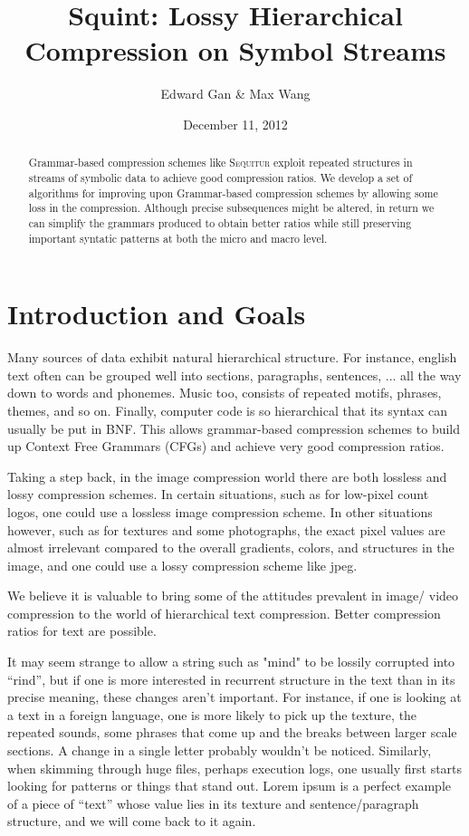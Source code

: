 \documentclass[11pt]{article}
\newcommand{\Sequitur}{\textsc{Sequitur}\xspace}
\begin{document}


\title{Squint: Lossy Hierarchical Compression on Symbol Streams}
\author{Edward Gan \& Max Wang}
\date{December 11, 2012}
\maketitle

\begin{abstract}
Grammar-based compression schemes like \Sequitur exploit repeated structures
in streams of symbolic data to achieve good compression ratios.
We develop a set of algorithms for improving upon Grammar-based compression 
schemes by allowing some loss in the compression. Although precise 
subsequences might be altered, in return we can simplify 
the grammars produced to obtain better ratios while still preserving
important syntatic patterns at both the micro and macro level.
\end{abstract}

\section{Introduction and Goals}
Many sources of data exhibit natural hierarchical structure. For instance,
english text often can be grouped well into sections, paragraphs, sentences, ...
all the way down to words and phonemes. Music too, consists of repeated motifs,
phrases, themes, and so on. Finally, computer code is so hierarchical that its
syntax can usually be put in BNF. This allows grammar-based compression schemes
to build up Context Free Grammars (CFGs) and achieve very good compression
ratios.

Taking a step back, in the image compression world there are both lossless and
lossy compression schemes. In certain situations, such as for low-pixel count
logos, one could use a lossless image compression scheme. In other situations
however, such as for textures and some photographs, the exact pixel values
are almost irrelevant compared to the overall gradients, colors, and structures
in the image, and one could use a lossy compression scheme like jpeg.

We believe it is valuable to bring some of the attitudes prevalent in image/
video compression to the world of hierarchical text compression. Better
compression ratios for text are possible. 

It may seem strange to allow a string such as "mind" to be lossily 
corrupted into ``rind'', but if one is more interested in recurrent 
structure in the text than in its precise meaning, these changes 
aren't important. For instance, if one is looking at a text in a foreign
language, one is more likely to pick up the texture, the repeated sounds,
some phrases that come up and the breaks between larger scale sections.
A change in a single letter probably wouldn't be noticed. Similarly,
when skimming through huge files, perhaps execution logs, one usually
first starts looking for patterns or things that stand out. Lorem ipsum
is a perfect example of a piece of ``text'' whose value lies in its texture
and sentence/paragraph structure, and we will come back to it again.
\end{document}
